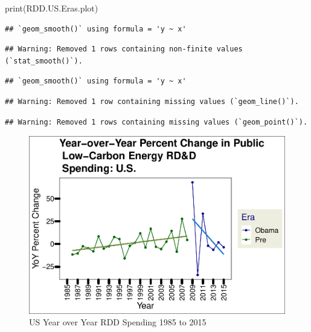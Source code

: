 \documentclass[
  12pt,
]{article}
\newenvironment{Shaded}{\begin{snugshade}}{\end{snugshade}}
\newcommand{\FunctionTok}[1]{\textcolor[rgb]{0.00,0.00,0.00}{#1}}
\newcommand{\NormalTok}[1]{#1}
\begin{document}
\begin{Shaded}
\begin{Highlighting}[]
\FunctionTok{print}\NormalTok{(RDD.US.Eras.plot)}
\end{Highlighting}
\end{Shaded}

\begin{verbatim}
## `geom_smooth()` using formula = 'y ~ x'
\end{verbatim}

\begin{verbatim}
## Warning: Removed 1 rows containing non-finite values (`stat_smooth()`).
\end{verbatim}

\begin{verbatim}
## `geom_smooth()` using formula = 'y ~ x'
\end{verbatim}

\begin{verbatim}
## Warning: Removed 1 row containing missing values (`geom_line()`).
\end{verbatim}

\begin{verbatim}
## Warning: Removed 1 rows containing missing values (`geom_point()`).
\end{verbatim}

\begin{figure}
\centering
\includegraphics{Chang_Jenkins_Mullens_ENV872_Final_files/figure-latex/visualizing the US data-1.pdf}
\caption{US Year over Year RDD Spending 1985 to 2015}
\end{figure}
\end{document}
